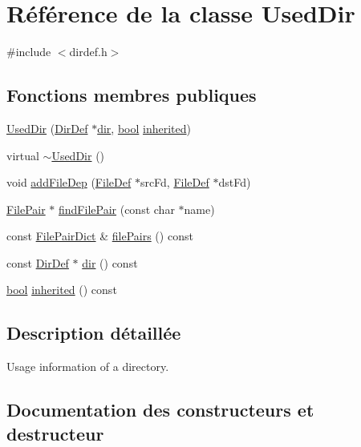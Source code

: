 \hypertarget{class_used_dir}{}\section{Référence de la classe Used\+Dir}
\label{class_used_dir}


{\ttfamily \#include $<$dirdef.\+h$>$}

\subsection*{Fonctions membres publiques}
\begin{DoxyCompactItemize}
\item 
\hyperlink{class_used_dir_a46516c4ec3cea28c6fa305b15ba0ffee}{Used\+Dir} (\hyperlink{class_dir_def}{Dir\+Def} $\ast$\hyperlink{class_used_dir_a467b8a03d2e9c61ff0692cfd539a4c79}{dir}, \hyperlink{qglobal_8h_a1062901a7428fdd9c7f180f5e01ea056}{bool} \hyperlink{class_used_dir_a4673343f118cca155ea46d6dcf37139e}{inherited})
\item 
virtual \hyperlink{class_used_dir_a5bd1a329733b6036d161f36139ed3915}{$\sim$\+Used\+Dir} ()
\item 
void \hyperlink{class_used_dir_ae5ae1dc265b0d82b60ffe52938bf549b}{add\+File\+Dep} (\hyperlink{class_file_def}{File\+Def} $\ast$src\+Fd, \hyperlink{class_file_def}{File\+Def} $\ast$dst\+Fd)
\item 
\hyperlink{class_file_pair}{File\+Pair} $\ast$ \hyperlink{class_used_dir_ac420432f250c5c034c3bfc60d65099a1}{find\+File\+Pair} (const char $\ast$name)
\item 
const \hyperlink{class_file_pair_dict}{File\+Pair\+Dict} \& \hyperlink{class_used_dir_a639dc9c90cb9c9362c5dfb0ddc548602}{file\+Pairs} () const 
\item 
const \hyperlink{class_dir_def}{Dir\+Def} $\ast$ \hyperlink{class_used_dir_a467b8a03d2e9c61ff0692cfd539a4c79}{dir} () const 
\item 
\hyperlink{qglobal_8h_a1062901a7428fdd9c7f180f5e01ea056}{bool} \hyperlink{class_used_dir_a4673343f118cca155ea46d6dcf37139e}{inherited} () const 
\end{DoxyCompactItemize}


\subsection{Description détaillée}
Usage information of a directory. 

\subsection{Documentation des constructeurs et destructeur}
\hypertarget{class_used_dir_a46516c4ec3cea28c6fa305b15ba0ffee}{}
